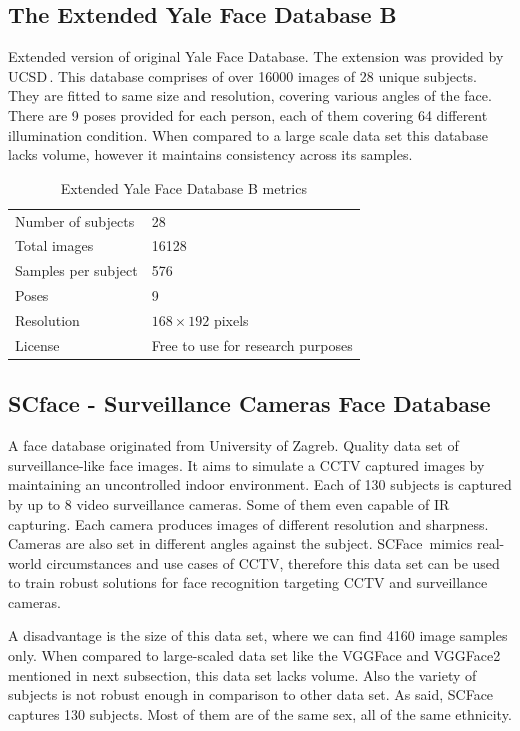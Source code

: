 \subsection{The Extended Yale Face Database B}

Extended version of original Yale Face Database. The extension was provided by UCSD\,\cite{ext_yale_paper}. This database comprises of over \num{16000} images of 28 unique subjects. They are fitted to same size and resolution, covering various angles of the face. There are 9 poses provided for each person, each of them covering 64 different illumination condition. When compared to a large scale data set this database lacks volume, however it maintains consistency across its samples.

\begin{table}[ht]
    \centering
    \begin{tabularx}{.8\textwidth}{l|X}
        \toprule
        Number of subjects & 28 \\
        Total images & \num{16128} \\
        Samples per subject & 576 \\
        Poses & 9 \\
        Resolution & $168 \times 192$ pixels \\
        License & Free to use for research purposes\\
        \bottomrule
    \end{tabularx}
    \caption{Extended Yale Face Database B metrics}
\end{table}

\subsection{SCface - Surveillance Cameras Face Database}

A face database originated from University of Zagreb. Quality data set of surveillance-like face images. It aims to simulate a CCTV captured images by maintaining an uncontrolled indoor environment. Each of 130 subjects is captured by up to 8 video surveillance cameras. Some of them even capable of IR capturing. Each camera produces images of different resolution and sharpness. Cameras are also set in different angles against the subject. SCFace\,\cite{scface} mimics real-world circumstances and use cases of CCTV, therefore this data set can be used to train robust solutions for face recognition targeting CCTV and surveillance cameras.

A disadvantage is the size of this data set, where we can find \num{4160} image samples only. When compared to large-scaled data set like the VGGFace and VGGFace2 mentioned in next subsection, this data set lacks volume. Also the variety of subjects is not robust enough in comparison to other data set. As said, SCFace captures 130 subjects. Most of them are of the same sex, all of the same ethnicity.

